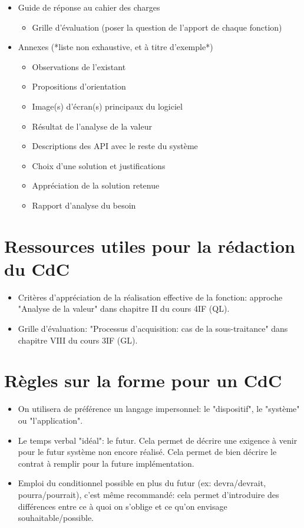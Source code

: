 \documentclass[a4paper]{article}
\begin{document}
\begin{itemize}
\item Guide de réponse au cahier des charges
  \begin{itemize}
  \item Grille d'évaluation (poser la question de l'apport de chaque fonction)
  \end{itemize}
\item Annexes (*liste non exhaustive, et à titre d'exemple*)
  \begin{itemize}
  \item Observations de l'existant
  \item Propositions d'orientation
  \item Image(s) d'écran(s) principaux du logiciel
  \item Résultat de l'analyse de la valeur
  \item Descriptions des API avec le reste du système
  \item Choix d'une solution et justifications
  \item Appréciation de la solution retenue
  \item Rapport d'analyse du besoin
  \end{itemize}
\end{itemize}

\section{Ressources utiles pour la rédaction du CdC}

\begin{itemize}
\item Critères d'appréciation de la réalisation effective de la fonction: approche "Analyse de la valeur" dans chapitre II du cours 4IF (QL).
\item Grille d'évaluation: "Processus d'acquisition: cas de la sous-traitance" dans chapitre VIII du cours 3IF (GL).
\end{itemize}


\section{Règles sur la forme pour un CdC}

\begin{itemize}
\item On utilisera de préférence un langage impersonnel: le "dispositif", le "système" ou "l'application".
\item Le temps verbal "idéal": le futur. Cela permet de décrire une exigence à venir pour le futur système non encore réalisé. Cela permet de bien décrire le contrat à remplir pour la future implémentation.
\item Emploi du conditionnel possible en plus du futur (ex: devra/devrait, pourra/pourrait), c'est même recommandé: cela permet d'introduire des différences entre ce à quoi on s'oblige et ce qu'on envisage souhaitable/possible.
\end{itemize}
\end{document}
